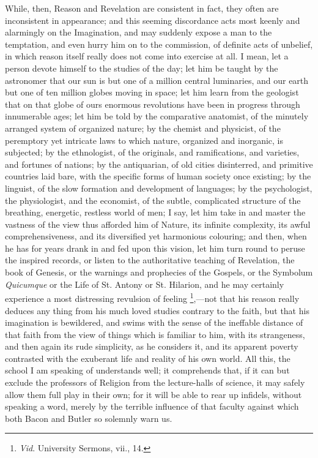 While, then, Reason and Revelation are consistent in fact, they
often are inconsistent in appearance; and this seeming discordance
acts most keenly and alarmingly on the Imagination, and may suddenly
expose a man to the temptation, and even hurry him on to the
commission, of definite acts of unbelief, in which reason itself
really does not come into exercise at all. I mean, let a person devote
himself to the studies of the day; let him be taught by the astronomer
that our sun is but one of a million central luminaries, and our earth
but one of ten million globes moving in space; let him learn from the
geologist that on that globe of ours enormous revolutions have been in
progress through innumerable ages; let him be told by the comparative
anatomist, of the minutely arranged system of organized nature; by the
chemist and physicist, of the peremptory yet intricate laws to which
nature, organized and inorganic, is subjected; by the ethnologist, of
the originals, and ramifications, and varieties, and fortunes of
nations; by the antiquarian, of old cities disinterred, and primitive
countries laid bare, with the specific forms of human society once
existing; by the linguist, of the slow formation and development of
languages; by the psychologist, the physiologist, and the economist,
of the subtle, complicated structure of the breathing, energetic,
restless world of men; I say, let him take in and master the
vastness of the view thus afforded him of Nature, its infinite
complexity, its awful comprehensiveness, and its diversified yet
harmonious colouring; and then, when he has for years drank in and fed
upon this vision, let him turn round to peruse the inspired records,
or listen to the authoritative teaching of Revelation, the book of
Genesis, or the warnings and prophecies of the Gospels, or the
Symbolum \emph{Quicumque} or the Life of St. Antony or St. Hilarion,
and he may certainly experience a most distressing revulsion of
feeling \footnote{\emph{Vid}. University Sermons, vii., 14.},—not that his
reason really deduces any thing from his much loved studies contrary
to the faith, but that his imagination is bewildered, and swims with
the sense of the ineffable distance of that faith from the view of
things which is familiar to him, with its strangeness, and then again
its rude simplicity, as he considers it, and its apparent poverty
contrasted with the exuberant life and reality of his own world. All
this, the school I am speaking of understands well; it comprehends
that, if it can but exclude the professors of Religion from the
lecture-halls of science, it may safely allow them full play in their
own; for it will be able to rear up infidels, without speaking a word,
merely by the terrible influence of that faculty against which both
Bacon and Butler so solemnly warn us.

